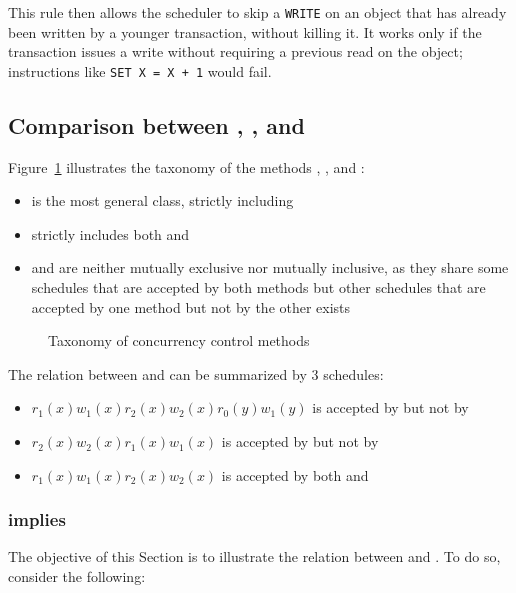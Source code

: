 \documentclass[english]{article}
\begin{document}
This rule then allows the scheduler to skip a \texttt{WRITE} on an object that has already been written by a younger transaction, without killing it.
It works only if the transaction issues a write without requiring a previous read on the object;
instructions like \texttt{SET X = X + 1} would fail.

\subsection{Comparison between \vsr, \csr, \tpl and \ts}

Figure~\ref{fig:concurrency-control-comparison} illustrates the taxonomy of the methods \vsr, \csr, \tpl and \ts:

\begin{itemize}
  \item \vsr is the most general class, strictly including \csr
  \item \csr strictly includes both \tpl and \ts
  \item \tpl and \ts are neither mutually exclusive nor mutually inclusive, as they share some schedules that are accepted by both methods but other schedules that are accepted by one method but not by the other exists
\end{itemize}

\begin{figure}[htbp]
  \centering
  \bigskip
  \caption{Taxonomy of concurrency control methods}
  \label{fig:concurrency-control-comparison}
  \bigskip
\end{figure}

\bigskip
The relation between \ts and \tpl can be summarized by \(3\) schedules:

\begin{itemize}
  \item \(r_1(x) w_1(x) r_2(x) w_2(x) r_0(y) w_1(y)\) is accepted by \ts but not by \tpl
  \item \(r_2(x) w_2(x) r_1(x) w_1(x)\) is accepted by \tpl but not by \ts
  \item \(r_1(x) w_1(x) r_2(x) w_2(x)\) is accepted by both \ts and \tpl
\end{itemize}

\subsubsection{\ts implies \csr}

The objective of this Section is to illustrate the relation between \ts and \csr.
To do so, consider the following:
\end{document}
